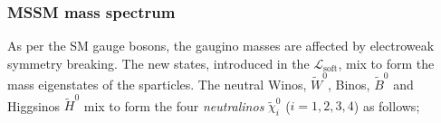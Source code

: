


			\subsubsection*{MSSM mass spectrum}




				As per the \ac{SM} gauge bosons, the gaugino masses are affected by electroweak symmetry breaking. The new states, introduced in the $\mathcal L_{\mathrm{soft}}$, mix to form the mass eigenstates of the sparticles. The neutral Winos, $\tilde{W}^0$, Binos, $\tilde{B}^0$ and Higgsinos $\tilde{H}^0$ mix to form the four \textit{neutralinos} $\tilde{\chi}^0_i$ ($i=1,2,3,4$) as follows; 

